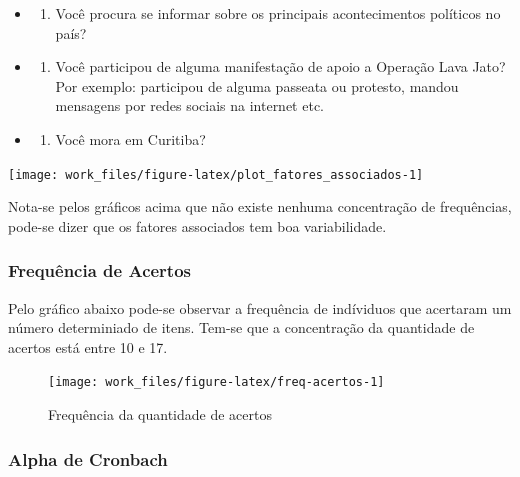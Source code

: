 \documentclass[]{article}
\providecommand{\tightlist}{%
  \setlength{\itemsep}{0pt}\setlength{\parskip}{0pt}}
\begin{document}
\begin{itemize}
\item
  \begin{enumerate}
  \def\labelenumi{\alph{enumi})}
  \tightlist
  \item
    Você procura se informar sobre os principais acontecimentos
    políticos no país?
  \end{enumerate}
\item
  \begin{enumerate}
  \def\labelenumi{\alph{enumi})}
  \setcounter{enumi}{1}
  \tightlist
  \item
    Você participou de alguma manifestação de apoio a Operação Lava
    Jato? Por exemplo: participou de alguma passeata ou protesto, mandou
    mensagens por redes sociais na internet etc.
  \end{enumerate}
\item
  \begin{enumerate}
  \def\labelenumi{\alph{enumi})}
  \setcounter{enumi}{2}
  \tightlist
  \item
    Você mora em Curitiba?
  \end{enumerate}
\end{itemize}

\begin{center}\texttt{[image: work\_files/figure-latex/plot\_fatores\_associados-1]} \end{center}

Nota-se pelos gráficos acima que não existe nenhuma concentração de
frequências, pode-se dizer que os fatores associados tem boa
variabilidade.

\subsubsection{Frequência de Acertos}\label{frequencia-de-acertos}

Pelo gráfico abaixo pode-se observar a frequência de indíviduos que
acertaram um número determiniado de itens. Tem-se que a concentração da
quantidade de acertos está entre 10 e 17.

\begin{figure}[H]

{\centering \texttt{[image: work\_files/figure-latex/freq-acertos-1]} 

}

\caption{Frequência da quantidade de acertos}\label{fig:freq-acertos}
\end{figure}

\subsubsection{Alpha de Cronbach}\label{alpha-de-cronbach}
\end{document}
